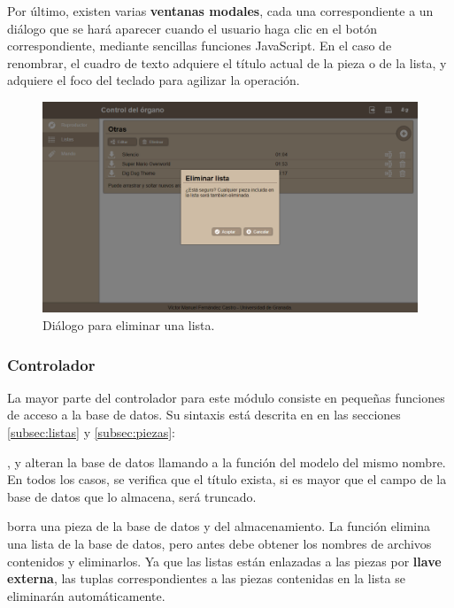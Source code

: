 Por último, existen varias \textbf{ventanas modales}, cada una correspondiente a un diálogo que se hará aparecer cuando el usuario haga clic en el botón correspondiente, mediante sencillas funciones JavaScript. En el caso de renombrar, el cuadro de texto adquiere el título actual de la pieza o de la lista, y adquiere el foco del teclado para agilizar la operación.

\smallskip

\begin{figure}[H]
	\noindent \begin{centering}
		\includegraphics[width=\linewidth*2/3]{capitulo5/cap_elim_lista}
		\par\end{centering}
	\smallskip
	\caption{\label{fig:cap_elim_lista} Diálogo para eliminar una lista.}
\end{figure} 

\smallskip

\subsubsection{Controlador}

La mayor parte del controlador para este módulo consiste en pequeñas funciones de acceso a la base de datos. Su sintaxis está descrita en en las secciones \ref{subsec:listas} y \ref{subsec:piezas}:

,  y  alteran la base de datos llamando a la función del modelo del mismo nombre. En todos los casos, se verifica que el título exista, si es mayor que el campo de la base de datos que lo almacena, será truncado.

 borra una pieza de la base de datos y del almacenamiento. La función  elimina una lista de la base de datos, pero antes debe obtener los nombres de archivos contenidos y eliminarlos. Ya que las listas están enlazadas a las piezas por \textbf{llave externa}, las tuplas correspondientes a las piezas contenidas en la lista se eliminarán automáticamente.

